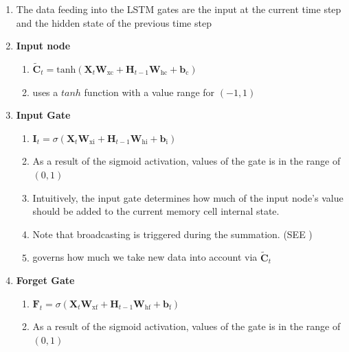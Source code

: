 \begin{enumerate}[itemsep=0.15cm]
    \item The data feeding into the LSTM gates are the input at the current time step and the hidden state of the previous time step

    \item \textbf{Input node}
    \begin{enumerate}
        \item $\tilde{\mathbf{C}}_t = \textrm{tanh}(\mathbf{X}_t \mathbf{W}_{\textrm{xc}} + \mathbf{H}_{t-1} \mathbf{W}_{\textrm{hc}} + \mathbf{b}_\textrm{c})$

        \item uses a $tanh$ function with a value range for $(-1, 1)$

    \end{enumerate}

    \item \textbf{Input Gate}
    \begin{enumerate}
        \item $\mathbf{I}_t = \sigma(\mathbf{X}_t \mathbf{W}_{\textrm{xi}} + \mathbf{H}_{t-1} \mathbf{W}_{\textrm{hi}} + \mathbf{b}_\textrm{i})$

        \item As a result of the sigmoid activation, values of the gate is in the range of $(0,1)$

        \item Intuitively, the input gate determines how much of the input node’s value should be added to the current memory cell internal state.

        \item Note that broadcasting is triggered during the summation. (SEE )

        \item governs how much we take new data into account via $\tilde{\mathbf{C}}_t$
    \end{enumerate}

    \item \textbf{Forget Gate}
    \begin{enumerate}
        \item $\mathbf{F}_t = \sigma(\mathbf{X}_t \mathbf{W}_{\textrm{xf}} + \mathbf{H}_{t-1} \mathbf{W}_{\textrm{hf}} + \mathbf{b}_\textrm{f})$

        \item As a result of the sigmoid activation, values of the gate is in the range of $(0,1)$


\end{enumerate}
\end{enumerate}

